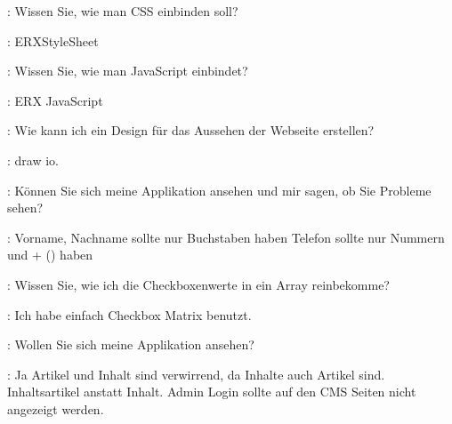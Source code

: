 \documentclass[a4paper, 11pt]{article}
\begin{document}
\begin{drama}
\msspeaks: Wissen Sie, wie man CSS einbinden soll?

\lucasspeaks: ERXStyleSheet

\msspeaks: Wissen Sie, wie man JavaScript einbindet?

\lucasspeaks: ERX JavaScript

\msspeaks: Wie kann ich ein Design für das Aussehen der Webseite erstellen?

\lucasspeaks: draw io.

\msspeaks: Können Sie sich meine Applikation ansehen und mir sagen, ob Sie Probleme sehen?

\lucasspeaks:
    Vorname, Nachname sollte nur Buchstaben haben
    Telefon sollte nur Nummern und + () haben

\msspeaks: Wissen Sie, wie ich die Checkboxenwerte in ein Array reinbekomme?

\standhardspeaks: Ich habe einfach Checkbox Matrix benutzt.

\msspeaks: Wollen Sie sich meine Applikation ansehen?

\fuscospeaks: Ja
    Artikel und Inhalt sind verwirrend, da Inhalte auch Artikel sind. Inhaltsartikel anstatt Inhalt.
    Admin Login sollte auf den CMS Seiten nicht angezeigt werden.

\end{drama}
\end{document}
